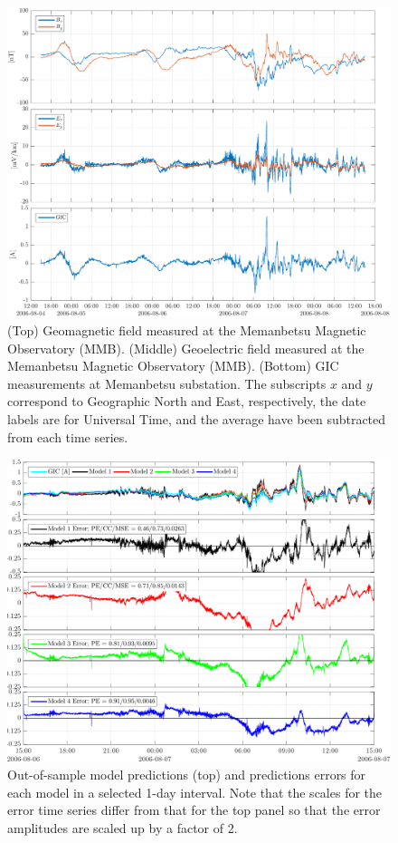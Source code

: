 \documentclass[draft,linenumbers]{agujournal2018}
\begin{document}
\begin{figure}[h]
  \centering
  \includegraphics[width=\textwidth]{figures/plot_raw_All_20060805-v1.pdf}
  \caption{(Top) Geomagnetic field measured at the Memanbetsu Magnetic Observatory (MMB). (Middle) Geoelectric field measured at the Memanbetsu Magnetic Observatory (MMB). (Bottom) GIC measurements at Memanbetsu substation. The subscripts $x$ and $y$ correspond to Geographic North and East, respectively, the date labels are for Universal Time, and the average have been subtracted from each time series.}
  \label{sample}
\end{figure}

\begin{figure}[h]
  \centering
  \includegraphics[width=\textwidth]{figures/plot_GIC_predictions-MeanModel-2006-08-06-v0-o0.pdf}
  \caption{Out-of-sample model predictions (top) and predictions errors for each model in a selected 1-day interval. Note that the scales for the error time series differ from that for the top panel so that the error amplitudes are scaled up by a factor of 2.}
  \label{predictions}
\end{figure}
\end{document}
